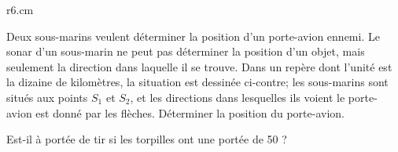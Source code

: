 
\begin{exercice}\label{exosmath-0617}

\begin{wrapfigure}{r}{6.cm}
   \vspace{-1cm}        %
   \centering
   
\end{wrapfigure}

    Deux sous-marins veulent déterminer la position d'un porte-avion ennemi. Le sonar d'un sous-marin ne peut pas déterminer la position d'un objet, mais seulement la direction dans laquelle il se trouve. Dans un repère dont l'unité est la dizaine de kilomètres, la situation est dessinée ci-contre; les sous-marins sont situés aux points \( S_1\) et \( S_2\), et les directions dans lesquelles ils voient le porte-avion est donné par les flèches. Déterminer la position du porte-avion.

    Est-il à portée de tir si les torpilles ont une portée de \unit{50}{\kilo\meter} ?


\end{exercice}
